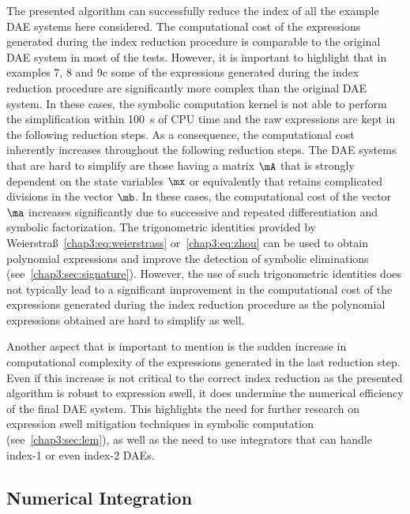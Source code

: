 The presented algorithm can successfully reduce the index of all the example \ac{DAE} systems here considered. The computational cost of the expressions generated during the index reduction procedure is comparable to the original \ac{DAE} system in most of the tests. However, it is important to highlight that in examples 7, 8 and 9c some of the expressions generated during the index reduction procedure are significantly more complex than the original \ac{DAE} system. In these cases, the \Maple{} symbolic computation kernel is not able to perform the simplification within \SI{100}{\second} of CPU time and the raw expressions are kept in the following reduction steps. As a consequence, the computational cost inherently increases throughout the following reduction steps. The \ac{DAE} systems that are hard to simplify are those having a matrix $\mA$ that is strongly dependent on the state variables $\mx$ or equivalently that retains complicated divisions in the vector $\mb$. In these cases, the computational cost of the vector $\ma$ increases significantly due to successive and repeated differentiation and symbolic factorization. The trigonometric identities provided by Weierstra{\ss}~\eqref{chap3:eq:weierstrass} or~\eqref{chap3:eq:zhou} can be used to obtain polynomial expressions and improve the detection of symbolic eliminations (see~\ref{chap3:sec:signature}). However, the use of such trigonometric identities does not typically lead to a significant improvement in the computational cost of the expressions generated during the index reduction procedure as the polynomial expressions obtained are hard to simplify as well.

Another aspect that is important to mention is the sudden increase in computational complexity of the expressions generated in the last reduction step. Even if this increase is not critical to the correct index reduction as the presented algorithm is robust to expression swell, it does undermine the numerical efficiency of the final \ac{DAE} system. This highlights the need for further research on expression swell mitigation techniques in symbolic computation (see~\ref{chap3:sec:lem}), as well as the need to use integrators that can handle index-1 or even index-2 \acp{DAE}.

\subsection{Numerical Integration}

